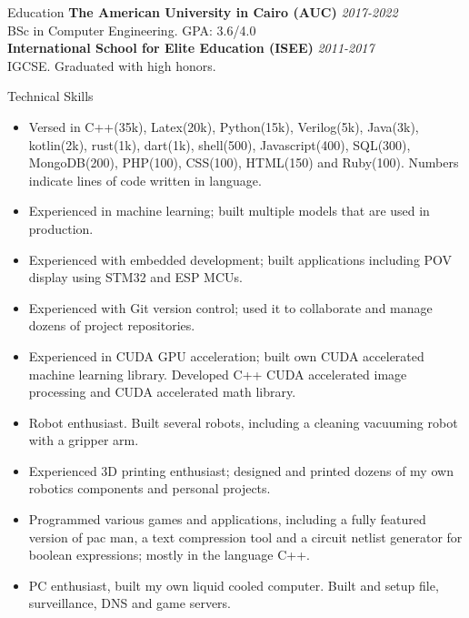 \documentclass{resume}
\begin{document}
\begin{small}
	
	\begin{rSection}{Education}
		{\bf The American University in Cairo (AUC)} \hfill {\em 2017-2022} \\
		BSc in Computer Engineering. GPA: 3.6/4.0\\
		{\bf International School for Elite Education (ISEE)} \hfill {\em 2011-2017}\\
		IGCSE. Graduated with high honors.
	\end{rSection}
	
	\begin{rSection}{Technical Skills}
		\begin{itemize}
			\itemsep-0.4em
			\item Versed in C++(35k), Latex(20k), Python(15k), Verilog(5k), Java(3k), kotlin(2k), rust(1k), dart(1k), shell(500), Javascript(400), SQL(300), MongoDB(200), PHP(100), CSS(100), HTML(150) and Ruby(100). Numbers indicate lines of code written in language.
			\item Experienced in machine learning; built multiple models that are used in production.
			\item Experienced with embedded development; built applications including POV display using STM32 and ESP MCUs.
			\item Experienced with Git version control; used it to collaborate and manage dozens of project repositories.
			\item Experienced in CUDA GPU acceleration; built own CUDA accelerated machine learning library. Developed C++ CUDA accelerated image processing and CUDA accelerated math library.
			\item Robot enthusiast. Built several robots, including a cleaning vacuuming robot with a gripper arm.
			\item Experienced 3D printing enthusiast; designed and printed dozens of my own robotics components and personal projects.
			\item Programmed various games and applications, including a fully featured version of pac man, a text compression tool and a circuit netlist generator for boolean expressions; mostly in the language C++.
			\item PC enthusiast, built my own liquid cooled computer. Built and setup file, surveillance, DNS and game servers.
		\end{itemize}
	\end{rSection}


\end{small}
\end{document}
